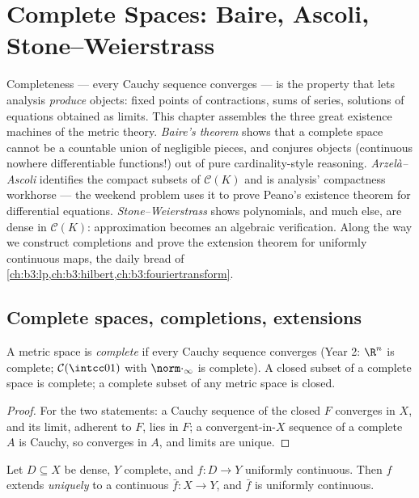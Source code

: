\chapter{Complete Spaces: Baire, Ascoli, Stone--Weierstrass}
\label{ch:b3:complete}

Completeness --- every Cauchy sequence converges --- is the
property that lets analysis \emph{produce} objects: fixed points
of contractions, sums of series, solutions of equations obtained
as limits. This chapter assembles the three great existence
machines of the metric theory. \emph{Baire's theorem} shows that
a complete space cannot be a countable union of negligible
pieces, and conjures objects (continuous nowhere differentiable
functions!) out of pure cardinality-style reasoning.
\emph{Arzel\`a--Ascoli} identifies the compact subsets of
$\mathcal C(K)$ and is analysis' compactness workhorse --- the
weekend problem uses it to prove Peano's existence theorem for
differential equations. \emph{Stone--Weierstrass} shows
polynomials, and much else, are dense in $\mathcal C(K)$:
approximation becomes an algebraic verification. Along the way we
construct completions and prove the extension theorem for
uniformly continuous maps, the daily bread of
\cref{ch:b3:lp,ch:b3:hilbert,ch:b3:fouriertransform}.

\section{Complete spaces, completions, extensions}

\begin{definition}\label{def:b3:complete:complete}
A metric space is \emph{complete} if
every Cauchy sequence converges (Year 2: $\R^n$ is complete;
$\mathcal C(\intcc01)$ with $\norm\cdot_\infty$ is complete). A
closed subset of a complete space is complete; a complete subset
of any metric space is closed.
\end{definition}

\begin{proof}
For the two statements: a Cauchy sequence of the closed $F$
converges in $X$, and its limit, adherent to $F$, lies in $F$; a
convergent-in-$X$ sequence of a complete $A$ is Cauchy, so
converges in $A$, and limits are unique.
\end{proof}

\begin{theorem}
\label{thm:b3:complete:extension}
Let $D \subseteq X$ be dense, $Y$ complete, and $f \colon D \to
Y$ uniformly continuous. Then $f$ extends \emph{uniquely} to a
continuous $\bar f \colon X \to Y$, and $\bar f$ is uniformly
continuous.
\end{theorem}

